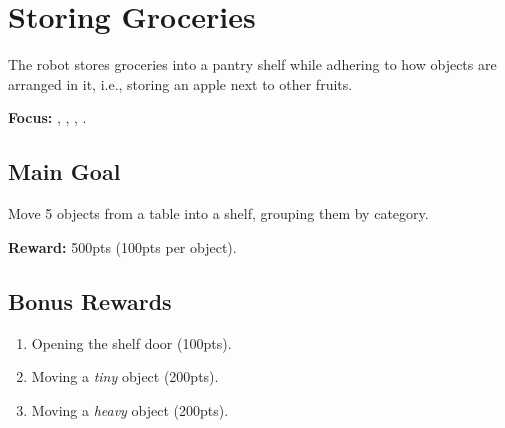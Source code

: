 \section{Storing Groceries}
\label{test:storing-groceries}
The robot stores groceries into a pantry shelf while adhering to how objects are arranged in it, i.e., storing an apple next to other fruits.

\noindent \textbf{Focus:} \SysI, \MAN, \CV, \OR.


\subsection*{Main Goal}
Move 5 objects from a table into a shelf, grouping them by category.

\noindent\textbf{Reward:} 500pts (100pts per object).

\subsection*{Bonus Rewards}
\begin{enumerate}[nosep]
	\item Opening the shelf door (100pts).
	\item Moving a \emph{tiny} object (200pts).
	\item Moving a \emph{heavy} object (200pts).
\end{enumerate}

%
%
